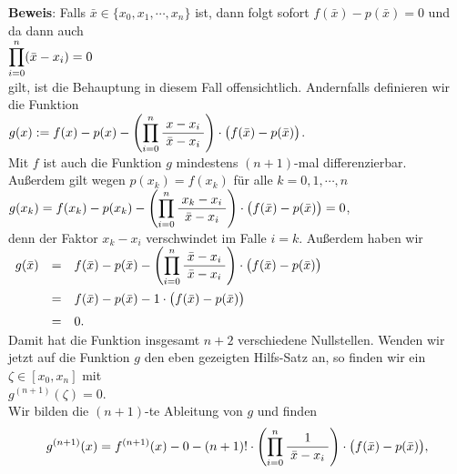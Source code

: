 \noindent
\textbf{Beweis}: Falls $\bar{x} \in \{x_0,x_1,\cdots,x_n\}$ ist, dann folgt sofort
$f(\bar{x}) - p(\bar{x}) = 0$ und da dann auch 
\\[0.2cm]
\hspace*{1.3cm}
 $\displaystyle\prod\limits_{i=0}^{n}(\bar{x}-x_i) = 0$ 
\\[0.2cm]
gilt, ist die Behauptung in diesem Fall offensichtlich.  Andernfalls 
definieren wir die Funktion 
\\[0.2cm]
\hspace*{1.3cm}
$\displaystyle g(x) := f(x) - p(x) - \left(\prod\limits_{i=0}^{n} \displaystyle\frac{\;\displaystyle x-x_i\;}{\;\displaystyle\bar{x}-x_i\;}\right) \cdot  \bigl(f(\bar{x}) - p(\bar{x})\bigr)$.
\\[0.2cm]
Mit $f$ ist auch die Funktion $g$ mindestens $(n+1)$-mal differenzierbar.  Au{\ss}erdem gilt
wegen $p(x_k) = f(x_k)$ f\"ur alle $k=0,1,\cdots,n$
\\[0.2cm]
\hspace*{1.3cm}
$\displaystyle g(x_k) = f(x_k) - p(x_k) - \left(\prod\limits_{i=0}^{n} \displaystyle\frac{\;\displaystyle x_k-x_i\;}{\;\displaystyle\bar{x}-x_i\;}\right) \cdot  \bigl(f(\bar{x}) - p(\bar{x})\bigr) = 0$,
\\[0.2cm]
denn der Faktor $x_k-x_i$ verschwindet im Falle $i=k$. Au{\ss}erdem haben wir 
\\[0.2cm]
\hspace*{1.3cm}
$
\begin{array}[t]{lcl}
  g(\bar{x}) & = & \displaystyle f(\bar{x}) - p(\bar{x}) - \left(\prod\limits_{i=0}^{n} \displaystyle\frac{\;\displaystyle\bar{x}-x_i\;}{\;\displaystyle\bar{x}-x_i\;}\right) \cdot  \bigl(f(\bar{x}) - p(\bar{x})\bigr) \\[0.5cm]
             & = & \displaystyle f(\bar{x}) - p(\bar{x}) - 1\cdot \bigl(f(\bar{x}) - p(\bar{x})\bigr) \\[0.2cm]
             & = & 0.
\end{array}
$
\\[0.2cm]
Damit hat die Funktion insgesamt $n+2$ verschiedene Nullstellen.  Wenden wir jetzt auf die
Funktion $g$ den eben gezeigten Hilfs-Satz an, so finden wir
ein $\zeta\in [x_0,x_n]$  mit 
\\[0.2cm]
\hspace*{1.3cm} $g^{(n+1)}(\zeta) = 0$. 
\\[0.2cm]
Wir bilden die $(n+1)$-te Ableitung von $g$ und finden 
\begin{equation}
  \label{eq:polynomAbschaetzung}
g^{(n+1)}(x) = f^{(n+1)}(x) - 0 - (n+1)!\cdot  \left(\prod\limits_{i=0}^{n} \displaystyle\frac{\;\displaystyle1\;}{\;\displaystyle\bar{x} - x_i\;}\right)\cdot  \bigl(f(\bar{x}) - p(\bar{x})\bigr),
\end{equation}
